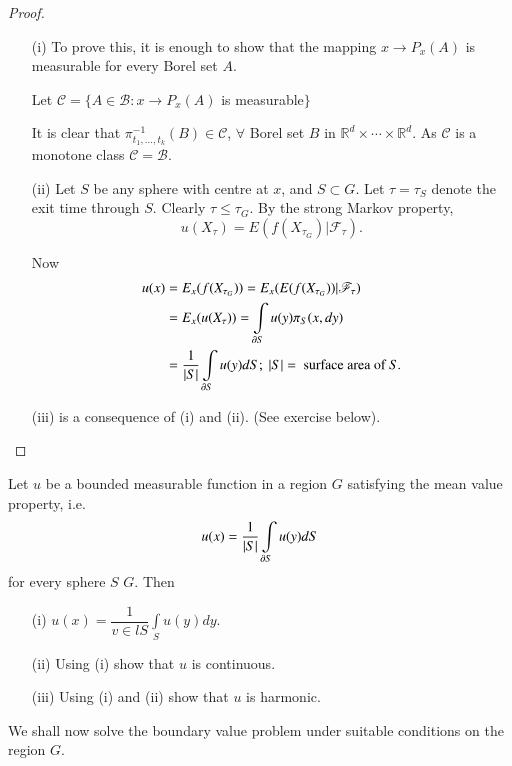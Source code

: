 \begin{proof}
\begin{itemize}
\item[(i)] To prove this, it is enough to show that the mapping $x\to
  P_{x}(A)$ is measurable for every Borel set $A$.

Let $\mathscr{C}=\{A\in\mathscr{B}:x\to P_{x}(A)$ is measurable$\}$

It is clear that $\pi^{-1}_{t_{1},\ldots,t_{k}}(B)\in\mathscr{C}$,
$\forall$ Borel set $B$ in $\mathbb{R}^{d}\times\cdots\times
\mathbb{R}^{d}$. As $\mathscr{C}$ is a monotone class
$\mathscr{C}=\mathscr{B}$.

\item[(ii)] Let $S$ be any sphere with centre at $x$, and $S\subset
  G$. Let $\tau=\tau_{S}$ denote the exit time through $S$. Clearly
  $\tau\leq \tau_{G}$. By the strong Markov property,
$$
u(X_{\tau})=E(f(X_{\tau_{G}})|\mathscr{F}_{\tau}).
$$

Now 
\begin{align*}
u(x) &=
E_{x}(f(X_{\tau_{G}}))=E_{x}(E(f(X_{\tau_{G}}))|\mathscr{F}_{\tau})\\
&= E_{x}(u(X_{\tau}))=\int\limits_{\partial S}u(y)\pi_{S}(x,dy)\\
&= \frac{1}{|S|}\int\limits_{\partial S}u(y)dS;\ |S|=\text{~ surface area
  of~ } S.
\end{align*}\pageoriginale

\item[(iii)] is a consequence of (i) and (ii). (See exercise below).
\end{itemize}
\end{proof}

\begin{dashexer*}
Let $u$ be a bounded measurable function in a region $G$ satisfying
the mean value property, i.e.
$$
u(x)=\frac{1}{|S|}\int\limits_{\partial S}u(y)dS
$$
for every sphere $S$ $G$. Then
\begin{itemize}
\item[(i)] $u(x)=\dfrac{1}{v\in lS}\int\limits_{S}u(y)dy$.

\item[(ii)] Using (i) show that $u$ is continuous.

\item[(iii)] Using (i) and (ii) show that $u$ is harmonic.
\end{itemize}

We shall now solve the boundary value problem under suitable
conditions on the region $G$.
\end{dashexer*}

